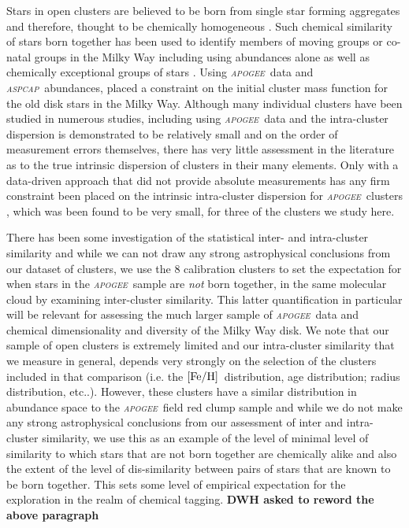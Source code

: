 \documentclass[14pt, preprint2]{aastex6}
\newcommand{\project}[1]{\textsl{#1}}
\newcommand{\apogee}{\project{\textsc{apogee}}}
\newcommand{\aspcap}{\project{\textsc{aspcap}}}
\newcommand{\feh}{\mbox{$\rm [Fe/H]$}}
\begin{document}
Stars in open clusters are believed to be born from single star forming aggregates and therefore, thought to be chemically homogeneous \citep[e.g.][]{deSilva2007,deSilva2009, Martell2016}. Such chemical similarity of stars born together has been used to identify members of moving groups or co-natal groups in the Milky Way including using abundances alone \citep[e.g.][]{Majewski2012a, Hogg2016} as well as chemically exceptional groups of stars \citep[e.g.][]{Schiavon2016, Martell2016}.  Using  \apogee\ data and \aspcap\ abundances, \citet{Ting2016} placed a constraint on the initial cluster mass function for the old disk stars in the Milky Way.  Although many individual clusters have been studied in numerous studies, including using \apogee\ data \citep[e.g.][]{Souto2016, Cuhna2015, F2013} and the intra-cluster dispersion is demonstrated to be relatively small and on the order of measurement errors themselves, there has very little assessment in the literature as to the true intrinsic dispersion of clusters in their many elements. Only with a data-driven approach that did not provide absolute measurements has any firm constraint been placed on the intrinsic intra-cluster dispersion for \apogee\ clusters \citep{Bovy2016}, which was been found to be very small, for three of the clusters we study here. 

There has been some investigation of the statistical inter- and intra-cluster similarity \citep[][]{M2014, deSilva2015} and while we can not draw any strong astrophysical conclusions from our dataset of clusters, we use the 8 calibration clusters to set the expectation for when stars in the \apogee\ sample are \textit{not} born together, in the same molecular cloud by examining inter-cluster similarity. This latter quantification in particular will be relevant for assessing the much larger sample of \apogee\ data and chemical dimensionality and diversity of the Milky Way disk. We note that our sample of open clusters is extremely limited and our intra-cluster similarity that we measure in general, depends very strongly on  the selection of the clusters included in that comparison (i.e. the \feh\ distribution, age distribution; radius distribution, etc..). However, these clusters have a similar distribution in abundance space to the \apogee\ field red clump sample and while we do not make any strong astrophysical conclusions from our assessment of inter and intra-cluster similarity, we use this as an example of the level of minimal level of similarity to which stars that are not born together are chemically alike and also the extent of the level of dis-similarity between pairs of stars that are known to be born together.  This sets some level of empirical expectation for the exploration in the realm of chemical tagging. 
\textbf{DWH asked to reword the above paragraph} 
\end{document}
